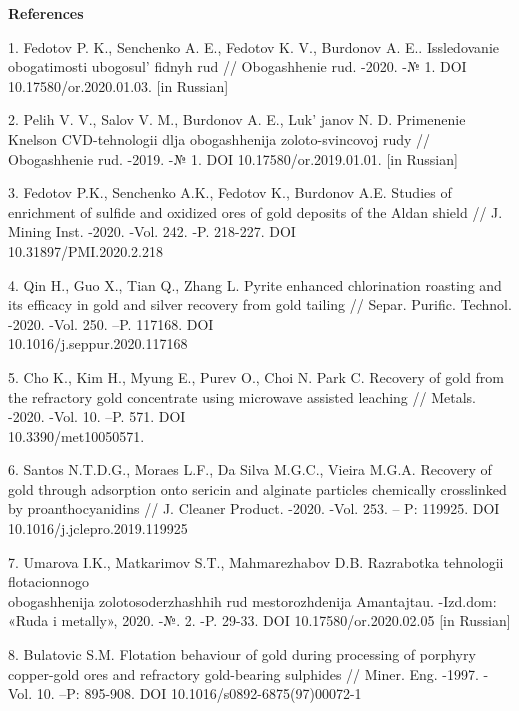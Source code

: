\begin{center}
{\bfseries References}
\end{center}

\begin{references}

1. Fedotov P. K., Senchenko A. E., Fedotov K. V., Burdonov A. E..
Issledovanie obogatimosti ubogosul' fidnyh rud //
Obogashhenie rud. -2020. -№ 1. DOI 10.17580/or.2020.01.03. {[}in
Russian{]}

2. Pelih V. V., Salov V. M., Burdonov A. E., Luk' janov
N. D. Primenenie Knelson CVD-tehnologii dlja obogashhenija
zoloto-svincovoj rudy // Obogashhenie rud. -2019. -№ 1. DOI
10.17580/or.2019.01.01. {[}in Russian{]}

3. Fedotov P.K., Senchenko A.K., Fedotov K., Burdonov A.E. Studies of
enrichment of sulfide and oxidized ores of gold deposits of the Aldan
shield // J. Mining Inst. -2020. -Vol. 242. -P. 218-227. DOI
\\10.31897/PMI.2020.2.218

4. Qin H., Guo X., Tian Q., Zhang L. Pyrite enhanced chlorination
roasting and its efficacy in gold and silver recovery from gold tailing
// Separ. Purific. Technol. -2020. -Vol. 250. --P. 117168. DOI
\\10.1016/j.seppur.2020.117168

5. Cho K., Kim H., Myung E., Purev O., Choi N. Park C. Recovery of gold
from the refractory gold concentrate using microwave assisted leaching
// Metals. -2020. -Vol. 10. --P. 571. DOI \\10.3390/met10050571.

6. Santos N.T.D.G., Moraes L.F., Da Silva M.G.C., Vieira M.G.A. Recovery
of gold through adsorption onto sericin and alginate particles
chemically crosslinked by proanthocyanidins // J. Cleaner Product.
-2020. -Vol. 253. -- P: 119925. DOI 10.1016/j.jclepro.2019.119925

7. Umarova I.K., Matkarimov S.T., Mahmarezhabov D.B. Razrabotka
tehnologii flotacionnogo \\obogashhenija zolotosoderzhashhih rud
mestorozhdenija Amantajtau. -Izd.dom: «Ruda i metally», 2020. -№. 2. -P.
29-33. DOI 10.17580/or.2020.02.05 {[}in Russian{]}

8. Bulatovic S.M. Flotation behaviour of gold during processing of
porphyry copper-gold ores and refractory gold-bearing sulphides //
Miner. Eng. -1997. -Vol. 10. --P: 895-908. DOI
10.1016/s0892-6875(97)00072-1
\end{references}


